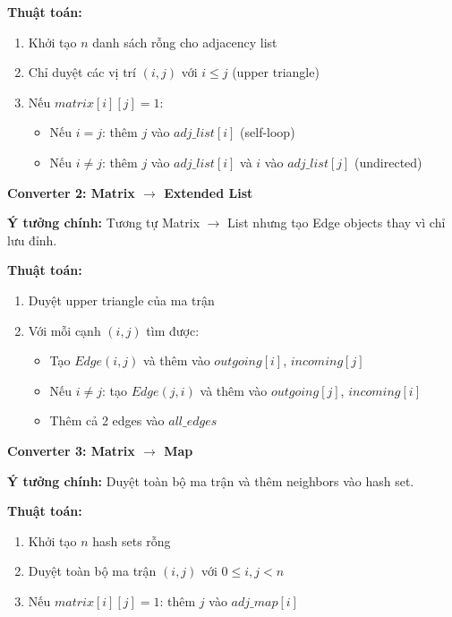 \documentclass[12pt,a4paper]{article}
\begin{document}
\textbf{Thuật toán:}
\begin{enumerate}
    \item Khởi tạo $n$ danh sách rỗng cho adjacency list
    \item Chỉ duyệt các vị trí $(i,j)$ với $i \leq j$ (upper triangle)
    \item Nếu $matrix[i][j] = 1$:
    \begin{itemize}
        \item Nếu $i = j$: thêm $j$ vào $adj\_list[i]$ (self-loop)
        \item Nếu $i \neq j$: thêm $j$ vào $adj\_list[i]$ và $i$ vào $adj\_list[j]$ (undirected)
    \end{itemize}
\end{enumerate}
\vspace{0.5cm}

\textbf{Converter 2: Matrix $\rightarrow$ Extended List}

\textbf{Ý tưởng chính:} Tương tự Matrix $\rightarrow$ List nhưng tạo Edge objects thay vì chỉ lưu đỉnh.

\textbf{Thuật toán:}
\begin{enumerate}
    \item Duyệt upper triangle của ma trận
    \item Với mỗi cạnh $(i,j)$ tìm được:
    \begin{itemize}
        \item Tạo $Edge(i,j)$ và thêm vào $outgoing[i]$, $incoming[j]$
        \item Nếu $i \neq j$: tạo $Edge(j,i)$ và thêm vào $outgoing[j]$, $incoming[i]$
        \item Thêm cả 2 edges vào $all\_edges$
    \end{itemize}
\end{enumerate}
\vspace{0.5cm}

\textbf{Converter 3: Matrix $\rightarrow$ Map}

\textbf{Ý tưởng chính:} Duyệt toàn bộ ma trận và thêm neighbors vào hash set.

\textbf{Thuật toán:}
\begin{enumerate}
    \item Khởi tạo $n$ hash sets rỗng
    \item Duyệt toàn bộ ma trận $(i,j)$ với $0 \leq i,j < n$
    \item Nếu $matrix[i][j] = 1$: thêm $j$ vào $adj\_map[i]$
\end{enumerate}
\vspace{0.5cm}
\end{document}

